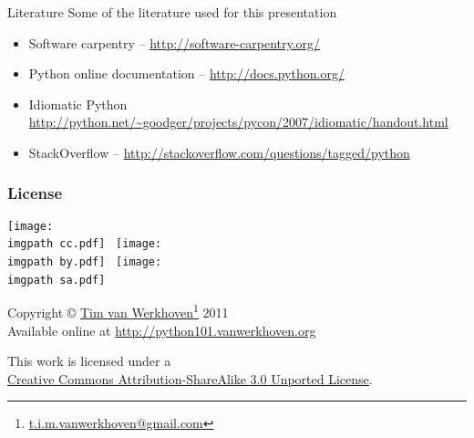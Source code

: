\documentclass[xetex,10pt]{beamer}
\def\imgpath{../00-img/}
\def\spacer{\vspace*{1em}}
\begin{document}
\begin{frame}{Literature}
	Some of the literature used for this presentation
	\spacer
	\begin{itemize}
		\item Software carpentry -- \url{http://software-carpentry.org/}
		\item Python online documentation -- \url{http://docs.python.org/}
		\item Idiomatic Python \url{http://python.net/~goodger/projects/pycon/2007/idiomatic/handout.html}
		\item StackOverflow -- \url{http://stackoverflow.com/questions/tagged/python}
	\end{itemize}
	
\end{frame}

\begin{frame}
	\frametitle{License}

	\begin{center}
	\texttt{[image: \\imgpath cc.pdf]}~
	\texttt{[image: \\imgpath by.pdf]}~
	\texttt{[image: \\imgpath sa.pdf]}~
	
	\spacer
	
	Copyright © \href{http://work.vanwerkhoven.org/}{Tim van Werkhoven}\footnote[frame]{\url{t.i.m.vanwerkhoven@gmail.com}} 2011\\
	Available online at \url{http://python101.vanwerkhoven.org}
	
	\spacer
	
	This work is licensed under a\\
	\href{http://creativecommons.org/licenses/by-sa/3.0/}{Creative Commons Attribution-ShareAlike 3.0 Unported License}.

	\end{center}
	
\end{frame}
\end{document}
